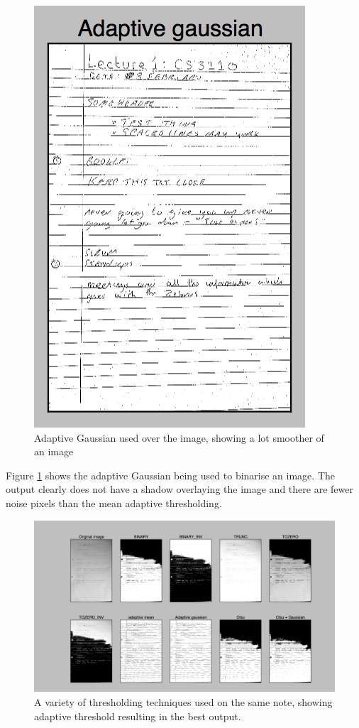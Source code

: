 \begin{figure}[H]
  \centering
  \includegraphics{images/adaptive_gaussian}
  \caption{Adaptive Gaussian used over the image, showing a lot smoother of an image}
  \label{fig:adaptive_gaussian}
\end{figure}

Figure \ref{fig:adaptive_gaussian} shows the adaptive Gaussian being used to binarise an image. The output clearly does not have a shadow overlaying the image and there are fewer noise pixels than the mean adaptive thresholding.

\begin{figure}[H]
  \centering
  \includegraphics[scale=0.25]{images/thresholding_options}
  \caption{A variety of thresholding techniques used on the same note, showing adaptive threshold resulting in the best output.}
  \label{fig:thresholding_options}
\end{figure}

